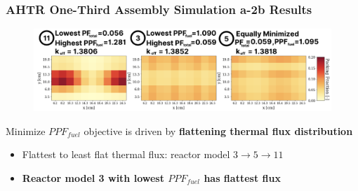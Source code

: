 \begin{frame}
    \frametitle{AHTR One-Third Assembly Simulation a-2b Results}
    \begin{figure}
        \centering
        \includegraphics[width=\linewidth]{figures/a-2b-comparison-reactors.png}
    \end{figure}

    Minimize $PPF_{fuel}$ objective is driven by \textbf{flattening thermal 
    flux distribution}  
    \begin{itemize}
        \item Flattest to least flat thermal flux: reactor model 
                $3 \rightarrow 5 \rightarrow 11$
        \item \textbf{Reactor model 3 with lowest $PPF_{fuel}$ has flattest flux}
    \end{itemize}

\end{frame}

